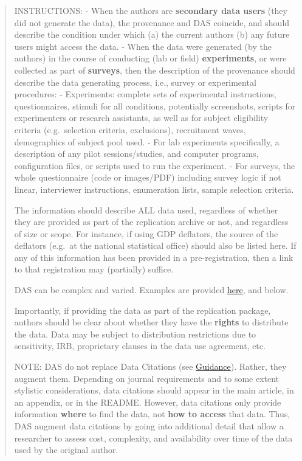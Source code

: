 \documentclass[
]{article}
\begin{document}
\begin{quote}
INSTRUCTIONS: - When the authors are \textbf{secondary data users} (they
did not generate the data), the provenance and DAS coincide, and should
describe the condition under which (a) the current authors (b) any
future users might access the data. - When the data were generated (by
the authors) in the course of conducting (lab or field)
\textbf{experiments}, or were collected as part of \textbf{surveys},
then the description of the provenance should describe the data
generating process, i.e., survey or experimental procedures: -
Experiments: complete sets of experimental instructions, questionnaires,
stimuli for all conditions, potentially screenshots, scripts for
experimenters or research assistants, as well as for subject eligibility
criteria (e.g.~selection criteria, exclusions), recruitment waves,
demographics of subject pool used. - For lab experiments specifically, a
description of any pilot sessions/studies, and computer programs,
configuration files, or scripts used to run the experiment. - For
surveys, the whole questionnaire (code or images/PDF) including survey
logic if not linear, interviewer instructions, enumeration lists, sample
selection criteria.

The information should describe ALL data used, regardless of whether
they are provided as part of the replication archive or not, and
regardless of size or scope. For instance, if using GDP deflators, the
source of the deflators (e.g.~at the national statistical office) should
also be listed here. If any of this information has been provided in a
pre-registration, then a link to that registration may (partially)
suffice.

DAS can be complex and varied. Examples are provided
\href{https://social-science-data-editors.github.io/guidance/Requested_information_dcas.html}{here},
and below.

Importantly, if providing the data as part of the replication package,
authors should be clear about whether they have the \textbf{rights} to
distribute the data. Data may be subject to distribution restrictions
due to sensitivity, IRB, proprietary clauses in the data use agreement,
etc.

NOTE: DAS do not replace Data Citations (see
\href{https://social-science-data-editors.github.io/template_README/Data_citation_guidance.html}{Guidance}).
Rather, they augment them. Depending on journal requirements and to some
extent stylistic considerations, data citations should appear in the
main article, in an appendix, or in the README. However, data citations
only provide information \textbf{where} to find the data, not
\textbf{how to access} that data. Thus, DAS augment data citations by
going into additional detail that allow a researcher to assess cost,
complexity, and availability over time of the data used by the original
author.
\end{quote}
\end{document}
